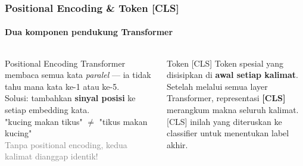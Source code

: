 \documentclass[t,aspectratio=169,xcolor=dvipsnames]{beamer}
\begin{document}
\begin{frame}
    \frametitle{Positional Encoding \& Token {[CLS]}}
    \framesubtitle{Dua komponen pendukung Transformer}
    \small
    \begin{columns}[T]
        \begin{block}{Positional Encoding}
            \footnotesize
            Transformer membaca semua kata \textit{paralel} — ia tidak tahu mana kata ke-1 atau ke-5.\\[0.3em]
            Solusi: tambahkan \textbf{sinyal posisi} ke setiap embedding kata.\\[0.3em]
            \textcolor{nyubluedarker}{"kucing makan tikus"} $\neq$ \textcolor{nyubluedarker}{"tikus makan kucing"}\\[0.2em]
            \textcolor{gray}{\tiny Tanpa positional encoding, kedua kalimat dianggap identik!}
        \end{block}

        \begin{exampleblock}{Token {[CLS]}}
            \footnotesize
            Token spesial yang disisipkan di \textbf{awal setiap kalimat}.\\[0.3em]
            Setelah melalui semua layer Transformer, representasi \textbf{[CLS]} merangkum makna seluruh kalimat.\\[0.2em]
            \textcolor{nyupurple}{[CLS] inilah yang diteruskan ke classifier untuk menentukan label akhir.}
        \end{exampleblock}
    \end{columns}

    \vspace{0.4em}
    \begin{center}
    \end{center}
\end{frame}
\end{document}
